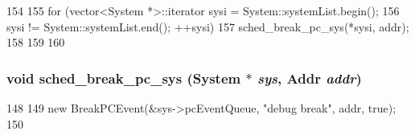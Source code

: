 \begin{DoxyCode}
154 {
155      for (vector<System *>::iterator sysi = System::systemList.begin();
156           sysi != System::systemList.end(); ++sysi) {
157          sched_break_pc_sys(*sysi, addr);
158     }
159 
160 }
\end{DoxyCode}
\hypertarget{pc__event_8hh_ac723c82598a63333ed963ff1788ae017}{
\subsubsection[{sched\_\-break\_\-pc\_\-sys}]{\setlength{\rightskip}{0pt plus 5cm}void sched\_\-break\_\-pc\_\-sys ({\bf System} $\ast$ {\em sys}, \/  {\bf Addr} {\em addr})}}
\label{pc__event_8hh_ac723c82598a63333ed963ff1788ae017}



\begin{DoxyCode}
148 {
149     new BreakPCEvent(&sys->pcEventQueue, "debug break", addr, true);
150 }
\end{DoxyCode}
